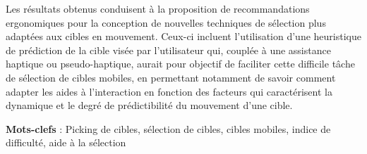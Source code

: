 Les résultats obtenus conduisent à la proposition de recommandations ergonomiques pour la conception de nouvelles techniques de sélection plus adaptées aux cibles en mouvement. Ceux-ci incluent l'utilisation d'une heuristique de prédiction de la cible visée par l’utilisateur qui, couplée à une assistance haptique ou pseudo-haptique, aurait pour objectif de faciliter cette difficile tâche de sélection de cibles mobiles, en permettant notamment de savoir comment adapter les aides à l'interaction en fonction des facteurs qui caractérisent la dynamique et le degré de prédictibilité du mouvement d'une cible.
 


\textbf{Mots-clefs} : Picking de cibles, sélection de cibles, cibles mobiles, indice de difficulté, aide à la sélection